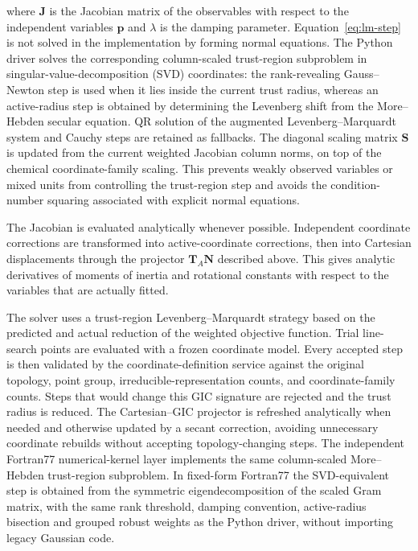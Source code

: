 \documentclass[journal=jctcce,manuscript=article,maxauthors=999]{achemso}
\begin{document}
where $\mathbf{J}$ is the Jacobian matrix of the observables with respect to
the independent variables $\mathbf{p}$ and $\lambda$ is the damping parameter.
Equation~\eqref{eq:lm-step} is not solved in the implementation by forming
normal equations. The Python driver solves the corresponding column-scaled
trust-region subproblem in singular-value-decomposition (SVD) coordinates:
the rank-revealing Gauss--Newton step is used when it lies inside the current
trust radius, whereas an active-radius step is obtained by determining the
Levenberg shift from the More--Hebden secular equation. QR solution of the
augmented Levenberg--Marquardt system and Cauchy steps are retained as
fallbacks.\cite{GolubReinsch1970} The
diagonal scaling matrix $\mathbf{S}$ is updated from the current weighted
Jacobian column norms, on top of the chemical coordinate-family scaling. This
prevents weakly observed variables or mixed units from controlling the
trust-region step and avoids the condition-number squaring associated with
explicit normal equations.

The Jacobian is evaluated analytically whenever possible. Independent
coordinate corrections are transformed into active-coordinate corrections,
then into Cartesian displacements through the projector
$\mathbf{T}_{A}\mathbf{N}$ described above. This gives analytic derivatives of
moments of inertia and rotational constants with respect to the variables that
are actually fitted.

The solver uses a trust-region Levenberg--Marquardt strategy based on the
predicted and actual reduction of the weighted objective
function.\cite{More1978LevenbergMarquardt} Trial line-search points are
evaluated with a frozen coordinate model. Every accepted step is then validated
by the coordinate-definition service against the original topology, point group,
irreducible-representation counts, and coordinate-family counts. Steps that
would change this GIC signature are rejected and the trust radius is reduced.
The Cartesian--GIC projector is refreshed analytically when needed and
otherwise updated by a secant correction, avoiding unnecessary coordinate
rebuilds without accepting topology-changing steps.
The independent Fortran77 numerical-kernel layer implements the same
column-scaled More--Hebden trust-region subproblem. In fixed-form Fortran77
the SVD-equivalent step is obtained from the symmetric eigendecomposition of
the scaled Gram matrix, with the same rank threshold, damping convention,
active-radius bisection and grouped robust weights as the Python driver,
without importing legacy Gaussian code.
\end{document}

